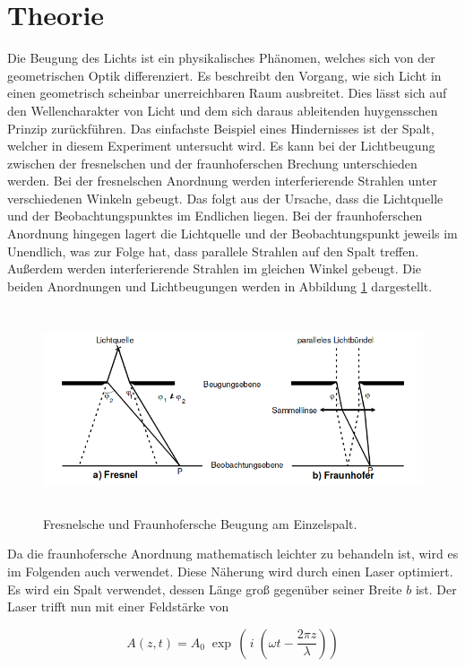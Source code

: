 \section{Theorie}
Die Beugung des Lichts ist ein physikalisches Phänomen, welches sich von der geometrischen Optik differenziert.
Es beschreibt den Vorgang, wie sich Licht in einen geometrisch scheinbar unerreichbaren Raum ausbreitet.
Dies lässt sich auf den Wellencharakter von Licht und dem sich daraus ableitenden huygensschen Prinzip zurückführen.
Das einfachste Beispiel eines Hindernisses ist der Spalt, welcher in diesem Experiment untersucht wird.
Es kann bei der Lichtbeugung zwischen der fresnelschen und der fraunhoferschen Brechung unterschieden werden.
Bei der fresnelschen Anordnung werden interferierende Strahlen unter verschiedenen Winkeln gebeugt.
Das folgt aus der Ursache, dass die Lichtquelle und der Beobachtungspunktes im Endlichen liegen.
Bei der fraunhoferschen Anordnung hingegen lagert die Lichtquelle und der Beobachtungspunkt jeweils im Unendlich, was zur Folge hat, dass parallele Strahlen auf den Spalt treffen.
Außerdem werden interferierende Strahlen im gleichen Winkel gebeugt.
Die beiden Anordnungen und Lichtbeugungen werden in Abbildung \ref{fig:Beugung} dargestellt.

\begin{figure}[H]
    \centering
    \includegraphics[height=6cm]{Theorie/Beugung.png}
    \caption{Fresnelsche und Fraunhofersche Beugung am Einzelspalt. \cite{1}}
    \label{fig:Beugung}
\end{figure}

Da die fraunhofersche Anordnung mathematisch leichter zu behandeln ist, wird es im Folgenden auch verwendet.
Diese Näherung wird durch einen Laser optimiert.
Es wird ein Spalt verwendet, dessen Länge groß gegenüber seiner Breite $b$ ist.
Der Laser trifft nun mit einer Feldstärke von

\begin{equation}
    A (z,t) = A_0 \; \exp \, \left (\,i \;\left (\omega t - \frac{2 \pi z}{\lambda}\right)\right)
    \label{eqn:Welle}
\end{equation}

